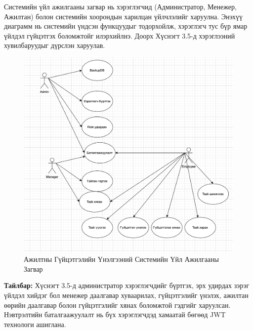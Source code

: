 
Системийн үйл ажилгааны загвар нь хэрэглэгчид (Администратор, Менежер, Ажилтан) болон системийн хоорондын харилцан үйлчлэлийг харуулна. Энэхүү диаграмм нь системийн үндсэн функцуудыг тодорхойлж, хэрэглэгч тус бүр ямар үйлдэл гүйцэтгэх боломжтойг илэрхийлнэ. Доорх Хүснэгт 3.5-д хэрэглээний хувилбаруудыг дүрслэн харуулав.

\begin{figure}[h!]
    \centering
    \includegraphics[width=\textwidth]{src/images/usecase-diagram.png}
    \caption{Ажилтны Гүйцэтгэлийн Үнэлгээний Системийн Үйл Ажилгааны Загвар}
    \label{fig:usecase_diagram}
\end{figure}

\textbf{Тайлбар:} Хүснэгт 3.5-д администратор хэрэглэгчдийг бүртгэх, эрх удирдах зэрэг үйлдэл хийдэг бол менежер даалгавар хуваарилах, гүйцэтгэлийг үнэлэх, ажилтан өөрийн даалгавар болон гүйцэтгэлийг хянах боломжтой гэдгийг харуулсан. Нэвтрэлтийн баталгаажуулалт нь бүх хэрэглэгчдэд хамаатай бөгөөд JWT технологи ашиглана.
\pagebreak